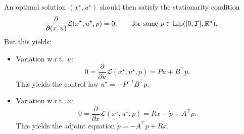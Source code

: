 An optimal solution $(x^\star, u^\star)$ should then satisfy the stationarity condition 
\begin{equation}
    \frac{\partial}{\partial (x,u)} \mathcal L(x^\star, u^\star, p) = 0, \qquad \text{for some } p \in\operatorname{Lip}([0,T],\mathbb{R}^d).
\end{equation}
But this yields:
\begin{itemize}
    \item Variation w.r.t.~$u$:
    \begin{equation}
        0= \frac{\partial}{\partial u} \mathcal L(x^\star, u^\star, p) = Pu + B^\top p.
    \end{equation}
    This yields the control law $u^\star = - P^{-1} B^\top p$.
    \item Variation w.r.t.~$x$: 
    \begin{equation}
        0 = \frac{\partial}{\partial x} \mathcal L(x^\star, u^\star, p) = R x - \dot p - A^\top p.
    \end{equation}
    This yields the adjoint equation $\dot p = -A^\top  p + Rx$.

\end{itemize}